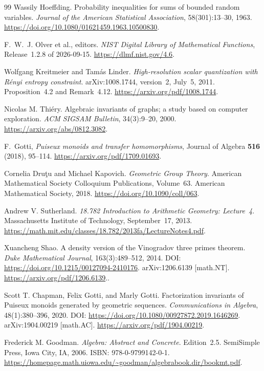 \documentclass[11pt]{scrartcl}
\begin{document}
\begin{thebibliography}{99}
	Wassily Hoeffding.
	\newblock Probability inequalities for sums of bounded random variables.
	\newblock \emph{Journal of the American Statistical Association},
	58(301):13--30, 1963.
	\newblock \url{https://doi.org/10.1080/01621459.1963.10500830}.

	F.~W.~J. Olver et al., editors.
	\newblock \emph{NIST Digital Library of Mathematical Functions},
	Release~1.2.8 of 2026-09-15.
	\newblock \url{https://dlmf.nist.gov/4.6}.

Wolfgang Kreitmeier and Tam\'as Linder.
\newblock \emph{High-resolution scalar quantization with
R\'enyi entropy constraint}.
\newblock arXiv:1008.1744, version~2, July~5, 2011.
\newblock Proposition~4.2 and Remark~4.12.
\newblock \url{https://arxiv.org/pdf/1008.1744}.

Nicolas M. Thi\'ery.
\newblock Algebraic invariants of graphs; a study based on computer exploration.
\newblock \emph{ACM SIGSAM Bulletin}, 34(3):9--20, 2000.
\newblock \url{https://arxiv.org/abs/0812.3082}.



F.~Gotti,
\emph{Puiseux monoids and transfer homomorphisms},
Journal of Algebra \textbf{516} (2018), 95--114.
\url{https://arxiv.org/pdf/1709.01693}.

Cornelia Dru{\c t}u and Michael Kapovich.
\newblock \emph{Geometric Group Theory}.
\newblock American Mathematical Society Colloquium Publications,
Volume~63.
\newblock American Mathematical Society, 2018.
\newblock \url{https://doi.org/10.1090/coll/063}.


Andrew V. Sutherland.
\newblock \emph{18.782 Introduction to Arithmetic Geometry:
Lecture~4}.
\newblock Massachusetts Institute of Technology, September~17, 2013.
\newblock \url{https://math.mit.edu/classes/18.782/2013fa/LectureNotes4.pdf}.

Xuancheng Shao.
\newblock A density version of the Vinogradov three primes theorem.
\newblock \emph{Duke Mathematical Journal}, 163(3):489--512, 2014.
\newblock DOI: \url{https://doi.org/10.1215/00127094-2410176}.
\newblock arXiv:1206.6139 [math.NT].
\newblock \url{https://arxiv.org/pdf/1206.6139}..

Scott T. Chapman, Felix Gotti, and Marly Gotti.
\newblock Factorization invariants of Puiseux monoids generated by
geometric sequences.
\newblock \emph{Communications in Algebra}, 48(1):380--396, 2020.
\newblock DOI: \url{https://doi.org/10.1080/00927872.2019.1646269}.
\newblock arXiv:1904.00219 [math.AC].
\newblock \url{https://arxiv.org/pdf/1904.00219}.

Frederick M. Goodman.
\newblock \emph{Algebra: Abstract and Concrete}.
\newblock Edition~2.5.
\newblock SemiSimple Press, Iowa City, IA, 2006.
\newblock ISBN: 978-0-9799142-0-1.
\newblock \url{https://homepage.math.uiowa.edu/~goodman/algebrabook.dir/bookmt.pdf}.
\end{thebibliography}
\end{document}
